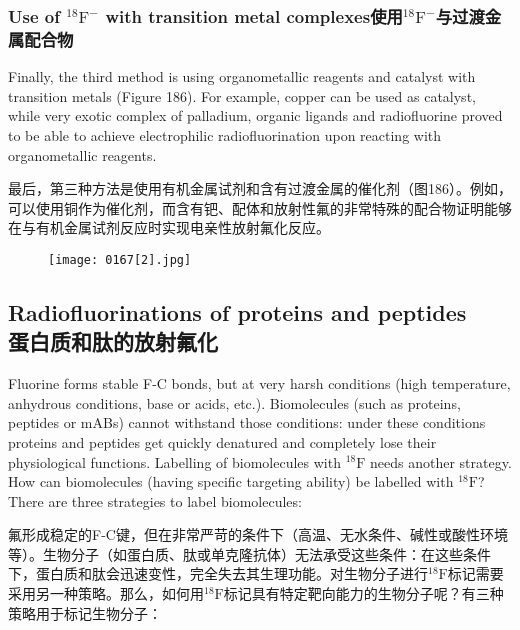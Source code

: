 \documentclass[dvipsnames, svgnames,a4paper,11pt]{article}
\begin{document}
\subsubsection{Use of ${}^\mathrm{18}\mathrm{F^-}$ with transition metal complexes使用${}^\mathrm{18}\mathrm{F^-}$与过渡金属配合物}



Finally, the third method is using organometallic reagents and catalyst with transition
metals (Figure 186). For example, copper can be used as catalyst, while very exotic
complex of palladium, organic ligands and radiofluorine proved to be able to achieve
electrophilic radiofluorination upon reacting with organometallic reagents.

最后，第三种方法是使用有机金属试剂和含有过渡金属的催化剂（图186）。例如，可以使用铜作为催化剂，而含有钯、配体和放射性氟的非常特殊的配合物证明能够在与有机金属试剂反应时实现电亲性放射氟化反应。

\begin{figure}[h]
	\centering
    \texttt{[image: 0167[2].jpg]}    
     \label{fig186}
\end{figure}

\subsection{Radiofluorinations of proteins and peptides \\蛋白质和肽的放射氟化}
Fluorine forms stable F-C bonds, but at very harsh conditions (high temperature,
anhydrous conditions, base or acids, etc.). Biomolecules (such as proteins, peptides
or mABs) cannot withstand those conditions: under these conditions proteins and
peptides get quickly denatured and completely lose their physiological functions.
Labelling of biomolecules with ${}^\mathrm{18}\mathrm{F}$ needs another strategy. How can biomolecules
(having specific targeting ability) be labelled with ${}^\mathrm{18}\mathrm{F}$? There are three strategies to
label biomolecules:

氟形成稳定的F-C键，但在非常严苛的条件下（高温、无水条件、碱性或酸性环境等）。生物分子（如蛋白质、肽或单克隆抗体）无法承受这些条件：在这些条件下，蛋白质和肽会迅速变性，完全失去其生理功能。对生物分子进行${}^\mathrm{18}\mathrm{F}$标记需要采用另一种策略。那么，如何用${}^\mathrm{18}\mathrm{F}$标记具有特定靶向能力的生物分子呢？有三种策略用于标记生物分子：
\end{document}
